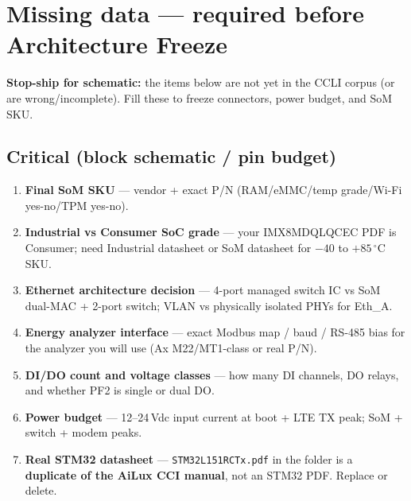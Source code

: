 \documentclass[10pt,a4paper]{article}
\newcommand{\file}[1]{\texttt{#1}}
\begin{document}
\section{Missing data --- required before Architecture Freeze}
\label{sec:missing}

\begin{center}
\begin{minipage}{0.95\linewidth}
\colorbox{missbg}{%
  \parbox{\dimexpr\linewidth-2\fboxsep\relax}{%
    \small
    \textbf{\textcolor{needR}{Stop-ship for schematic:}}
    the items below are not yet in the CCLI corpus (or are wrong/incomplete). Fill these to freeze connectors, power budget, and SoM SKU.
  }%
}
\end{minipage}
\end{center}

\subsection{Critical (block schematic / pin budget)}

\begin{enumerate}[leftmargin=*]
  \item \textbf{Final SoM SKU} --- vendor + exact P/N (RAM/eMMC/temp grade/Wi-Fi yes-no/TPM yes-no).
  \item \textbf{Industrial vs Consumer SoC grade} --- your IMX8MDQLQCEC PDF is Consumer; need Industrial datasheet or SoM datasheet for $-40$ to $+85\,^\circ$C SKU.
  \item \textbf{Ethernet architecture decision} --- 4-port managed switch IC vs SoM dual-MAC + 2-port switch; VLAN vs physically isolated PHYs for Eth\_A.
  \item \textbf{Energy analyzer interface} --- exact Modbus map / baud / RS-485 bias for the analyzer you will use (Ax M22/MT1-class or real P/N).
  \item \textbf{DI/DO count and voltage classes} --- how many DI channels, DO relays, and whether PF2 is single or dual DO.
  \item \textbf{Power budget} --- 12--24\,Vdc input current at boot + LTE TX peak; SoM + switch + modem peaks.
  \item \textbf{Real STM32 datasheet} --- \file{STM32L151RCTx.pdf} in the folder is a \textbf{duplicate of the AiLux CCI manual}, not an STM32 PDF. Replace or delete.
\end{enumerate}
\end{document}
